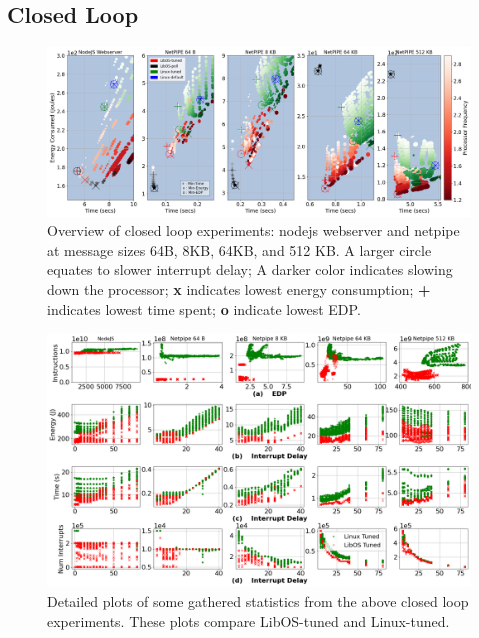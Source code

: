 \subsection{Closed Loop}
\label{sec:closed_loop}
\begin{figure}
\centering
\includegraphics[width=1\textwidth]{figures/closed_loop_overview.png}
\vspace*{-9mm}
\caption[]
{Overview of closed loop experiments: nodejs webserver and netpipe at message sizes 64B, 8KB, 64KB, and 512 KB.
A larger circle equates to slower interrupt delay;
A darker color indicates slowing down the processor;
\textbf{x} indicates lowest energy consumption;
\textbf{+} indicates lowest time spent;
\textbf{o} indicate lowest EDP.}
\label{fig:closed_loop_overview}
\end{figure}
\begin{figure}
\centering
\includegraphics[width=1\textwidth]{figures/closed_detail_1.png}
\vspace*{-9mm}
\caption[]
{Detailed plots of some gathered statistics from the above closed loop experiments.
These plots compare LibOS-tuned and Linux-tuned.}
\label{fig:closed_loop_detail_1}
\end{figure}
